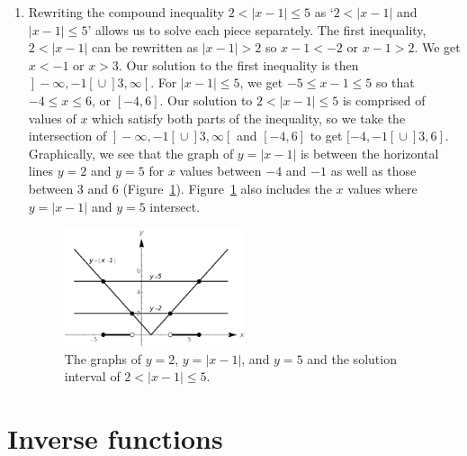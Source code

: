 \begin{example}
\begin{enumerate}
\item  Rewriting the compound inequality  $2 < |x-1| \leq 5$ as `$2 < |x-1|$ and $|x-1| \leq 5$' allows us to solve each piece separately.  The first inequality, $2 < |x-1|$ can be rewritten as $|x-1|>2$ so $x-1 < -2$ or $x-1 > 2$.  We get $x<-1$ or $x>3$.  Our solution to the first inequality is then $\left.\right]-\infty, -1\left[\right. \cup \left.\right]3, \infty\left[\right.$.  For $|x-1| \leq 5$, we  get $-5 \leq x-1 \leq 5$ so that $-4 \leq x \leq 6$, or $[-4,6]$.  Our solution to   $2 < |x-1| \leq 5$ is comprised of values of $x$ which satisfy both parts of the inequality, so we take the intersection of $\left.\right]-\infty, -1\left[\right. \cup \left.\right]3, \infty\left[\right.$ and $[-4,6]$ to get  $[-4,-1\left[\right. \cup \left.\right]3,6\left.\right]$.  Graphically, we see that the graph of $y=|x-1|$ is between the horizontal lines $y=2$ and $y=5$ for $x$ values between $-4$ and $-1$ as well as those between $3$ and $6$ (Figure~\ref{fig_functions_36}). Figure~\ref{fig_functions_36} also includes the $x$ values where $y=|x-1|$ and $y=5$ intersect.

\begin{figure}[H]
	\begin{center}
			\includegraphics[width=0.5\textwidth]{fig_functions_36}
	\caption{The graphs of $y = 2 $, $y = |x-1| $, and $y = 5$ and the solution interval of $2 < |x-1| \leq 5$.}
	\label{fig_functions_36}
	\end{center}
\end{figure}

	
\end{enumerate}
\end{example}

\fi
\fi



\section{Inverse functions}
\label{sec_inverse}

\ifvc
